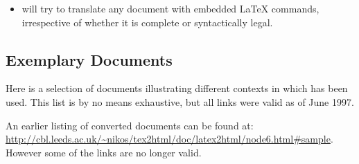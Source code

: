 \begin{itemize}
%
%

%
%
\item 
will try to translate any document with embedded \LaTeX{} commands, 
irrespective of whether it is complete or syntactically legal.

\end{itemize}


\subsection{Exemplary Documents\label{exemplary}}
Here is a selection of documents illustrating different contexts in 
which \latextohtml{} has been used. This list is by no means exhaustive,
but all links were valid as of June 1997.

\medskip\noindent
An earlier listing of converted documents can be found at:
\url{http://cbl.leeds.ac.uk/~nikos/tex2html/doc/latex2html/node6.html#sample}.
However some of the links are no longer valid.

